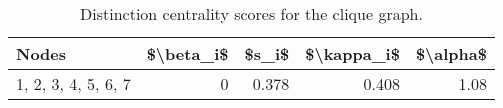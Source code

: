 \begin{table}
\centering
\caption{\label{tab:clique}Distinction centrality scores for the clique graph.}
\centering
\begin{tabular}[t]{lrrrr}
\toprule
Nodes & \$\textbackslash{}beta\_i\$ & \$s\_i\$ & \$\textbackslash{}kappa\_i\$ & \$\textbackslash{}alpha\$\\
\midrule
1, 2, 3, 4, 5, 6, 7 & 0 & 0.378 & 0.408 & 1.08\\
\bottomrule
\end{tabular}
\end{table}
